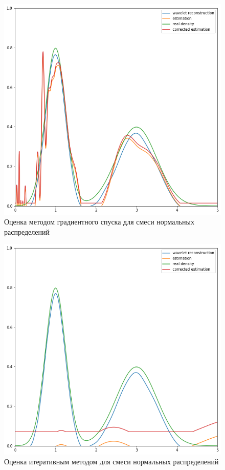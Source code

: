 \documentclass[12pt, a4paper]{report}
\begin{document}
\begin{figure}[h]
  \caption{Оценка методом градиентного спуска для смеси нормальных распределений}
  \centering
  \includegraphics[width=\textwidth]{est-l2}
\end{figure}

\begin{figure}[h]
  \caption{Оценка итеративным методом для смеси нормальных распределений}
  \centering
  \includegraphics[width=\textwidth]{est-it}
\end{figure}
\end{document}
